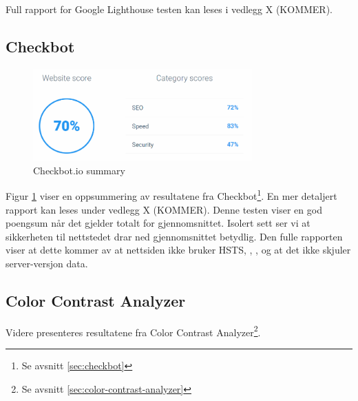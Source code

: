 Full rapport for Google Lighthouse testen kan leses i vedlegg X (KOMMER).

\subsection{Checkbot}
\begin{figure}[H]
    \centering
    \includegraphics[width=0.75\textwidth]{bjornar/checkbotio-summary.png}
    \caption{Checkbot.io summary}
    \label{fig:analysis-current-checkbot-summary}
\end{figure}

 Figur \ref{fig:analysis-current-checkbot-summary} viser en oppsummering av resultatene fra Checkbot\footnote{Se avsnitt \ref{sec:checkbot}}. En mer detaljert rapport kan leses under vedlegg X (KOMMER). Denne testen viser en god poengsum når det gjelder totalt for gjennomsnittet. Isolert sett ser vi at sikkerheten til nettstedet drar ned gjennomsnittet betydlig. Den fulle rapporten viser at dette kommer av at nettsiden ikke bruker HSTS, , ,  og at det ikke skjuler server-versjon data.

\subsection{Color Contrast Analyzer}
\label{sec:analysis-current-color-contrast-analyzer}
Videre presenteres resultatene fra Color Contrast Analyzer\footnote{Se avsnitt \ref{sec:color-contrast-analyzer}}.

